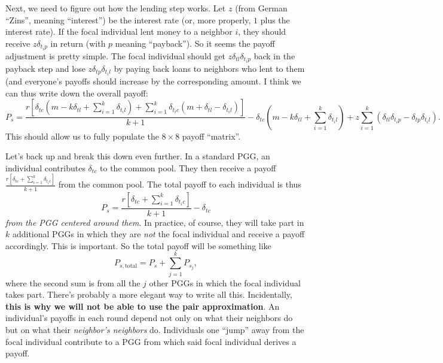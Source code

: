 \documentclass[14pt, a4paper, justified]{article}
\begin{document}
Next, we need to figure out how the lending step works.
Let $z$ (from German ``Zins'', meaning ``interest'') be the interest rate (or, more properly, $1$ plus the interest rate).
If the focal individual lent money to a neighbor $i$, they should receive $z \delta_{t_i p}$ in return (with $p$ meaning ``payback'').
So it seems the payoff adjustment is pretty simple.
The focal individual should get $z\delta_{tl} \delta_{t_i p}$ back in the payback step and lose $z \delta_{tp} \delta_{t_i l}$ by paying back loans to neighbors who lent to them (and everyone's payoffs should increase by the corresponding amount.
I think we can thus write down the overall payoff:
\begin{equation}
    P_s = \frac{r[\delta_{tc}(m - k\delta_{tl} + \sum_{i=1}^k \delta_{t_i l}) + \sum_{i=1}^k \delta_{t_i c} (m + \delta_{tl} - \delta_{t_i l})]}{k+1} - \delta_{tc}(m - k\delta_{tl} + \sum_{i=1}^k \delta_{t_i l}) + z\sum_{i=1}^k (\delta_{tl} \delta_{t_i p} - \delta_{tp} \delta_{t_i l}).
\end{equation}
This should allow us to fully populate the $8 \times 8$ payoff ``matrix''.

Let's back up and break this down even further.
In a standard PGG, an individual contributes $\delta_{tc}$ to the common pool.
They then receive a payoff $\frac{r[\delta_{tc} + \sum_{i=1}^k \delta_{t_i c}]}{k+1}$ from the common pool.
The total payoff to each individual is thus
\begin{equation}
    P_s = \frac{r[\delta_{tc} + \sum_{i=1}^k \delta_{t_i c}]}{k+1} - \delta_{tc}
\end{equation}
\emph{from the PGG centered around them}.
In practice, of course, they will take part in $k$ additional PGGs in which they are \emph{not} the focal individual and receive a payoff accordingly.
This is important.
So the total payoff will be something like
\begin{equation}
    P_{s, \mathrm{total}} = P_s + \sum_{j=1}^k P_{s_j},
\end{equation}
where the second sum is from all the $j$ other PGGs in which the focal individual takes part.
There's probably a more elegant way to write all this.
Incidentally, \textbf{this is why we will not be able to use the pair approximation}.
An individual's payoffs in each round depend not only on what their neighbors do but on what their \emph{neighbor's neighbors} do.
Individuals one ``jump'' away from the focal individual contribute to a PGG from which said focal individual derives a payoff.



\end{document}
